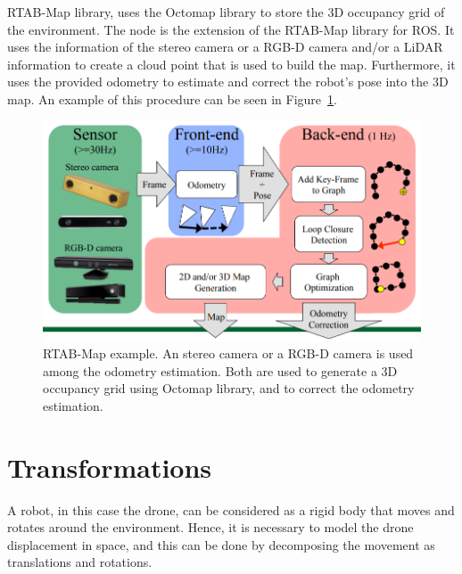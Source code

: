 RTAB-Map library, uses the Octomap library to store the 3D occupancy grid of the environment. The  node is the extension of the RTAB-Map library for ROS. It uses the information of the stereo camera or a RGB-D camera and/or a LiDAR information to create a cloud point that is used to build the map. Furthermore, it uses the provided odometry to estimate and correct the robot's pose into the 3D map. An example of this procedure can be seen in Figure~\ref{fig:chapter1:ros:rtabmap}.

\begin{figure}
    \centering
    \includegraphics[width=\textwidth]{Images/fig14-rtabmap3.png}
    \caption[RTAB-Map example]{RTAB-Map example. An stereo camera or a RGB-D camera is used among the odometry estimation. Both are used to generate a 3D occupancy grid using Octomap library, and to correct the odometry estimation. \cite{rtabmap-presentation}}
    \label{fig:chapter1:ros:rtabmap}
\end{figure}

\section{Transformations}
\label{sec:chapter1:transform}
A robot, in this case the drone, can be considered as a rigid body that moves and rotates around the environment. Hence, it is necessary to model the drone displacement in space, and this can be done by decomposing the movement as translations and rotations.

